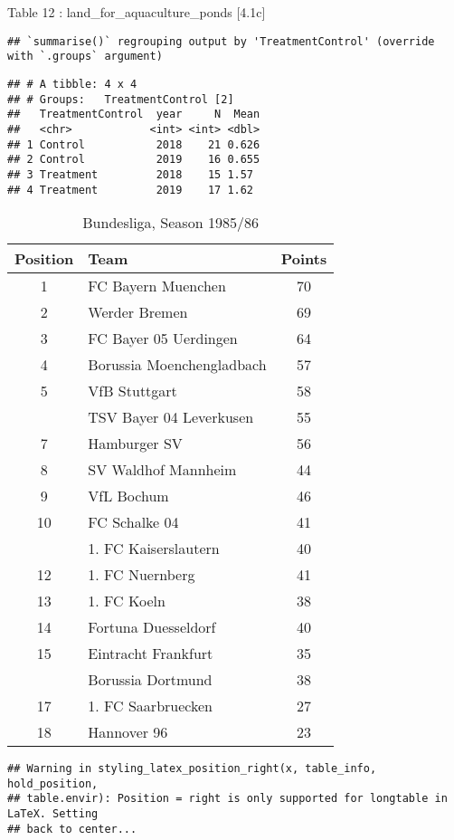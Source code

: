 \documentclass[
]{article}
\begin{document}
Table 12 : land\_for\_aquaculture\_ponds {[}4.1c{]}

\begin{verbatim}
## `summarise()` regrouping output by 'TreatmentControl' (override with `.groups` argument)
\end{verbatim}

\begin{verbatim}
## # A tibble: 4 x 4
## # Groups:   TreatmentControl [2]
##   TreatmentControl  year     N  Mean
##   <chr>            <int> <int> <dbl>
## 1 Control           2018    21 0.626
## 2 Control           2019    16 0.655
## 3 Treatment         2018    15 1.57 
## 4 Treatment         2019    17 1.62
\end{verbatim}

\begin{wraptable}{l}{0pt}

\caption{\label{tab:unnamed-chunk-2}Bundesliga, Season 1985/86}
\centering
\begin{tabular}[t]{clc}
\toprule
Position & Team & Points\\
\midrule
1 & FC Bayern Muenchen & 70\\
2 & Werder Bremen & 69\\
3 & FC Bayer 05 Uerdingen & 64\\
4 & Borussia Moenchengladbach & 57\\
5 & VfB Stuttgart & 58\\
\addlinespace
6 & TSV Bayer 04 Leverkusen & 55\\
7 & Hamburger SV & 56\\
8 & SV Waldhof Mannheim & 44\\
9 & VfL Bochum & 46\\
10 & FC Schalke 04 & 41\\
\addlinespace
11 & 1. FC Kaiserslautern & 40\\
12 & 1. FC Nuernberg & 41\\
13 & 1. FC Koeln & 38\\
14 & Fortuna Duesseldorf & 40\\
15 & Eintracht Frankfurt & 35\\
\addlinespace
16 & Borussia Dortmund & 38\\
17 & 1. FC Saarbruecken & 27\\
18 & Hannover 96 & 23\\
\bottomrule
\end{tabular}
\end{wraptable}

\begin{verbatim}
## Warning in styling_latex_position_right(x, table_info, hold_position,
## table.envir): Position = right is only supported for longtable in LaTeX. Setting
## back to center...
\end{verbatim}
\end{document}
